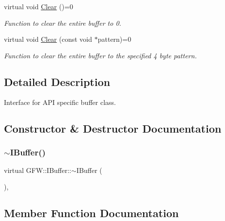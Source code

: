 \begin{DoxyCompactItemize}
virtual void \hyperlink{class_g_f_w_1_1_i_buffer_aba2a08606a8670cf1dc98f93095fbd88}{Clear} ()=0
\begin{DoxyCompactList}\small\item\em Function to clear the entire buffer to 0. \end{DoxyCompactList}\item 
virtual void \hyperlink{class_g_f_w_1_1_i_buffer_ac1605029b3f1e8cbfef8d30053ddac59}{Clear} (const void $\ast$pattern)=0
\begin{DoxyCompactList}\small\item\em Function to clear the entire buffer to the specified 4 byte pattern. \end{DoxyCompactList}\end{DoxyCompactItemize}


\subsection{Detailed Description}
Interface for A\+PI specific buffer class. 

\subsection{Constructor \& Destructor Documentation}
\mbox{\label{class_g_f_w_1_1_i_buffer_aef075064f4de9081c18ff6e4a4847e52}} 
\subsubsection{\texorpdfstring{$\sim$\+I\+Buffer()}{~IBuffer()}}
{\footnotesize\ttfamily virtual G\+F\+W\+::\+I\+Buffer\+::$\sim$\+I\+Buffer (\begin{DoxyParamCaption}{ }\end{DoxyParamCaption})\hspace{0.3cm}{\ttfamily [virtual]}, {\ttfamily [default]}}



\subsection{Member Function Documentation}
\mbox{\label{class_g_f_w_1_1_i_buffer_aba2a08606a8670cf1dc98f93095fbd88}} 

